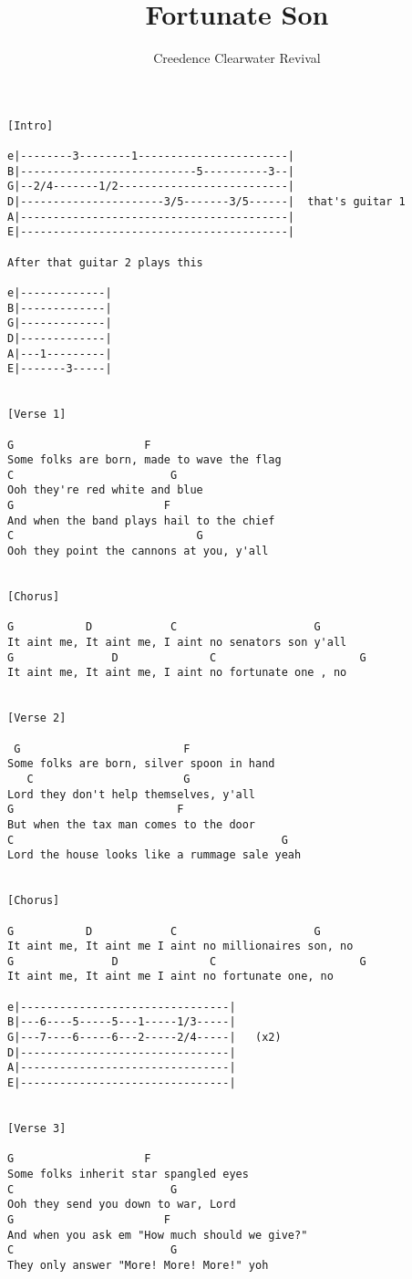 \documentclass{article}%
\title{Fortunate Son}
\date{}
\author{Creedence Clearwater Revival}
\begin{document}
\maketitle
\begin{verbatim}
[Intro]

e|--------3--------1-----------------------|
B|---------------------------5----------3--|
G|--2/4-------1/2--------------------------|
D|----------------------3/5-------3/5------|  that's guitar 1
A|-----------------------------------------|
E|-----------------------------------------|

After that guitar 2 plays this

e|-------------|
B|-------------|
G|-------------|
D|-------------|
A|---1---------|
E|-------3-----|


[Verse 1]

G                    F
Some folks are born, made to wave the flag
C                        G
Ooh they're red white and blue
G                       F
And when the band plays hail to the chief
C                            G
Ooh they point the cannons at you, y'all


[Chorus]

G           D            C                     G
It aint me, It aint me, I aint no senators son y'all
G               D              C                      G
It aint me, It aint me, I aint no fortunate one , no


[Verse 2]

 G                         F
Some folks are born, silver spoon in hand
   C                       G
Lord they don't help themselves, y'all
G                         F
But when the tax man comes to the door
C                                         G
Lord the house looks like a rummage sale yeah


[Chorus]

G           D            C                     G
It aint me, It aint me I aint no millionaires son, no
G               D              C                      G
It aint me, It aint me I aint no fortunate one, no

e|--------------------------------|
B|---6----5-----5---1-----1/3-----|
G|---7----6-----6---2-----2/4-----|   (x2)
D|--------------------------------|
A|--------------------------------|
E|--------------------------------|


[Verse 3]

G                    F
Some folks inherit star spangled eyes
C                        G
Ooh they send you down to war, Lord
G                       F
And when you ask em "How much should we give?"
C                        G
They only answer "More! More! More!" yoh



\end{verbatim}
\end{document}

